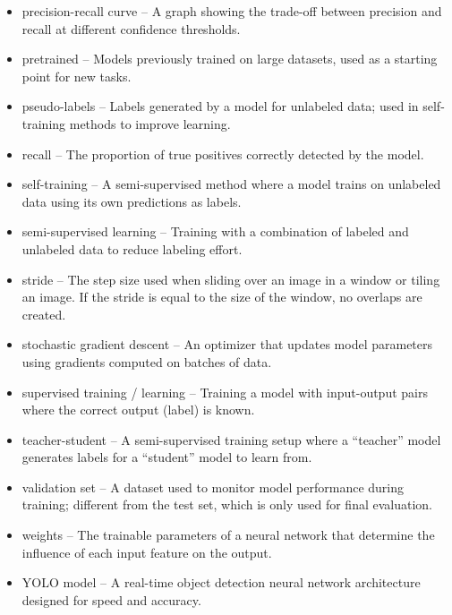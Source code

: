 \documentclass[12pt,a4paper]{article}
\begin{document}
\begin{itemize}
    \item precision-recall curve – A graph showing the trade-off between precision and recall at different confidence thresholds.
    \item pretrained – Models previously trained on large datasets, used as a starting point for new tasks.
    \item pseudo-labels – Labels generated by a model for unlabeled data; used in self-training methods to improve learning.
    \item recall – The proportion of true positives correctly detected by the model.
    \item self-training – A semi-supervised method where a model trains on unlabeled data using its own predictions as labels.
    \item semi-supervised learning – Training with a combination of labeled and unlabeled data to reduce labeling effort.
    \item stride – The step size used when sliding over an image in a window or tiling an image. If the stride is equal to the size of the window, no overlaps are created.
    \item stochastic gradient descent – An optimizer that updates model parameters using gradients computed on batches of data.
    \item supervised training / learning – Training a model with input-output pairs where the correct output (label) is known.
    \item teacher-student – A semi-supervised training setup where a “teacher” model generates labels for a “student” model to learn from.
    \item validation set – A dataset used to monitor model performance during training; different from the test set, which is only used for final evaluation.  
    \item weights – The trainable parameters of a neural network that determine the influence of each input feature on the output.
    \item YOLO model – A real-time object detection neural network architecture designed for speed and accuracy.
\end{itemize}
\end{document}
